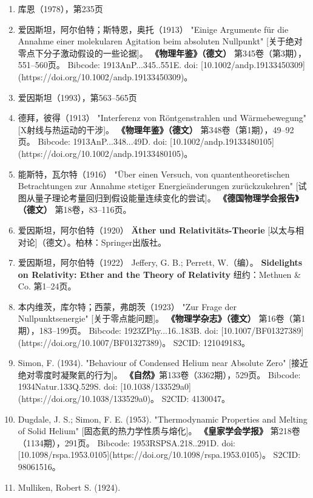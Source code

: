\begin{enumerate}
\item 库恩（1978），第235页 
\item 爱因斯坦，阿尔伯特；斯特恩，奥托（1913）  
  "Einige Argumente für die Annahme einer molekularen Agitation beim absoluten Nullpunkt" [关于绝对零点下分子激动假设的一些论据]。  
  \textbf{《物理年鉴》（德文）} 第345卷（第3期），551–560页。  
  Bibcode: 1913AnP...345..551E.  
  doi: [10.1002/andp.19133450309](https://doi.org/10.1002/andp.19133450309)。  
\item 爱因斯坦（1993），第563–565页 
\item 德拜，彼得（1913） 
  "Interferenz von Röntgenstrahlen und Wärmebewegung" [X射线与热运动的干涉]。  
  \textbf{《物理年鉴》（德文）} 第348卷（第1期），49–92页。  
  Bibcode: 1913AnP...348...49D.  
  doi: [10.1002/andp.19133480105](https://doi.org/10.1002/andp.19133480105)。  
\item 能斯特，瓦尔特（1916）  
  "Über einen Versuch, von quantentheoretischen Betrachtungen zur Annahme stetiger Energieänderungen zurückzukehren" [试图从量子理论考量回归到假设能量连续变化的尝试]。  
  \textbf{《德国物理学会报告》（德文）} 第18卷，83–116页。  
\item 爱因斯坦，阿尔伯特（1920） 
  \textbf{Äther und Relativitäts-Theorie} [以太与相对论]（德文）。柏林：Springer出版社。  
\item 爱因斯坦，阿尔伯特（1922）  
  Jeffery, G. B.; Perrett, W.（编）。  
  \textbf{Sidelights on Relativity: Ether and the Theory of Relativity}  
  纽约：Methuen & Co. 第1–24页。  
\item 本内维茨，库尔特；西蒙，弗朗茨（1923） 
  "Zur Frage der Nullpunktsenergie" [关于零点能问题]。  
  \textbf{《物理学杂志》（德文）} 第16卷（第1期），183–199页。  
  Bibcode: 1923ZPhy...16..183B.  
  doi: [10.1007/BF01327389](https://doi.org/10.1007/BF01327389)。  
  S2CID: 121049183。
\item Simon, F. (1934). 
  "Behaviour of Condensed Helium near Absolute Zero" [接近绝对零度时凝聚氦的行为]。  
  \textbf{《自然》}第133卷（3362期），529页。  
  Bibcode: 1934Natur.133Q.529S.  
  doi: [10.1038/133529a0](https://doi.org/10.1038/133529a0)。  
  S2CID: 4130047。  
\item Dugdale, J. S.; Simon, F. E. (1953).  
  "Thermodynamic Properties and Melting of Solid Helium" [固态氦的热力学性质与熔化]。  
 \textbf{《皇家学会学报》 }第218卷（1134期），291页。  
  Bibcode: 1953RSPSA.218..291D.  
  doi: [10.1098/rspa.1953.0105](https://doi.org/10.1098/rspa.1953.0105)。  
  S2CID: 98061516。  
\item Mulliken, Robert S. (1924). 

\end{enumerate}
